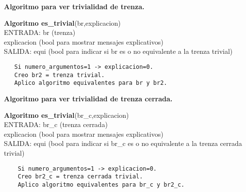 \bigskip
\begin{center}
	\textbf{Algoritmo para ver trivialidad de trenza.}
\end{center} 

\begin{alg}
	\textbf{Algoritmo es\_trivial}(br,explicacion)\\
	ENTRADA: br (trenza)\\
	\hspace*{2.2cm} explicacion (bool para mostrar mensajes explicativos)\\
	SALIDA: \hspace{0.4cm} equi (bool para indicar si br es o no equivalente a la trenza trivial)
	
\begin{lstlisting}
   Si numero_argumentos=1 -> explicacion=0.
   Creo br2 = trenza trivial. 
   Aplico algoritmo equivalentes para br y br2.
\end{lstlisting}
\end{alg}

\begin{center}
	\textbf{Algoritmo para ver trivialidad de trenza cerrada.}
\end{center} 

\begin{alg}
	\textbf{Algoritmo es\_trivial}(br\_c,explicacion)\\
	ENTRADA: br\_c (trenza cerrada)\\
	\hspace*{2.2cm} explicacion (bool para mostrar mensajes explicativos)\\
	SALIDA: \hspace{0.4cm} equi (bool para indicar si br\_c es o no equivalente a la trenza cerrada trivial)
	
	\begin{lstlisting}
	Si numero_argumentos=1 -> explicacion=0.
	Creo br2_c = trenza cerrada trivial. 
	Aplico algoritmo equivalentes para br_c y br2_c.
	\end{lstlisting}
\end{alg}